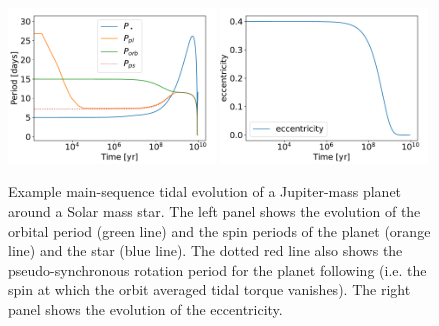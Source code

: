 \begin{figure}[t]
%
    \centering
%
    \includegraphics[width=0.49\textwidth]{example_evolution_periods.pdf}
%
    \includegraphics[width=0.49\textwidth]{example_evolution_eccentricity.pdf}
%
    \caption{
%
        Example main-sequence tidal evolution of a Jupiter-mass planet around a
        Solar mass star. The left panel shows the evolution of the orbital
        period (green line) and the spin periods of the planet (orange line) and
        the star (blue line). The dotted red line also shows the
        pseudo-synchronous rotation period for the planet following
        \citet{Hut_81} (i.e. the spin at which the orbit averaged tidal torque
        vanishes). The right panel shows the evolution of the eccentricity.
%
    }
%
    \label{fig:example_evolution}
%
\end{figure}
